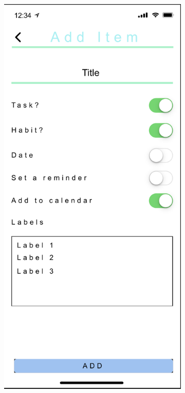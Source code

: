 \begin{figure}[H]
    \centering
    \begin{subfigure}[b]{0.3\textwidth}
        \centering
        \includegraphics[width=\textwidth]{./graphics/design/Add Item Colour.png}

\end{subfigure}
\end{figure}
